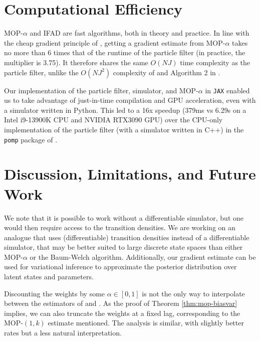 \documentclass[11pt]{article}
\begin{document}
\section{Computational Efficiency}

MOP-$\alpha$ and IFAD are fast algorithms, both in theory and practice. In line with the cheap gradient principle of \cite{kakade2019provably}, getting a gradient estimate from MOP-$\alpha$ takes no more than 6 times that of the runtime of the particle filter (in practice, the multiplier is 3.75). It therefore shares the same $O(NJ)$ time complexity as the particle filter, unlike the $O(NJ^2)$ complexity of \cite{corenflos21} and Algorithm 2 in \cite{poyiadjis11, scibior21}.



Our implementation of the particle filter, simulator, and MOP-$\alpha$ in \texttt{JAX} \cite{jax} enabled us to take advantage of just-in-time compilation and GPU acceleration, even with a simulator written in Python. This led to a 16x speedup (379ms vs 6.29s on a Intel i9-13900K CPU and NVIDIA RTX3090 GPU) over the CPU-only implementation of the particle filter (with a simulator written in C++) in the \texttt{pomp} package of \cite{king16}. 






\section{Discussion, Limitations, and Future Work}

We note that it is possible to work without a differentiable simulator, but one would then require access to the transition densities. We are working on an analogue that uses (differentiable) transition densities instead of a differentiable simulator, that may be better suited to large discrete state spaces than either MOP-$\alpha$ or the Baum-Welch algorithm.
Additionally, our gradient estimate can be used for variational inference to approximate the posterior distribution over latent states \cite{naesseth18} and parameters. 

Discounting the weights by some $\alpha \in [0,1]$ is not the only way to interpolate between the estimators of \cite{naesseth18} and \cite{poyiadjis11}. As the proof of Theorem \ref{thm:mop-biasvar} implies, we can also truncate the weights at a fixed lag, corresponding to the MOP-$(1,k)$ estimate mentioned. The analysis is similar, with slightly better rates but a less natural interpretation. 
\end{document}
